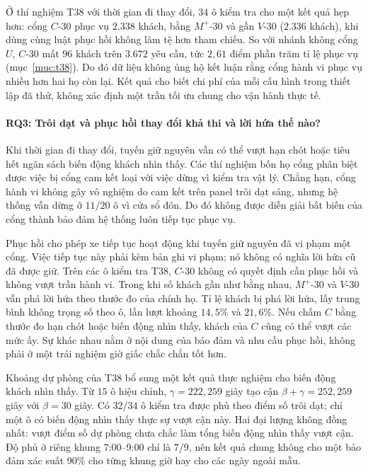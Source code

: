 Ở thí nghiệm T38 với thời gian đi thay đổi, $34$ ô kiểm tra cho một kết quả hẹp hơn:
cổng $C$-30 phục vụ $2.338$ khách, bằng $M^{+}$-30 và gần $V$-30 ($2.336$ khách), khi dùng
cùng luật phục hồi không làm tệ hơn tham chiếu. So với nhánh không cổng $U$, $C$-30 mất
$96$ khách trên $3.672$ yêu cầu, tức $2{,}61$ điểm phần trăm tỉ lệ phục vụ
(mục~\ref{muc:t38}). Do đó dữ liệu không ủng hộ kết luận rằng cổng hành vi phục vụ nhiều
hơn hai họ còn lại. Kết quả cho biết chi phí của mỗi cấu hình trong thiết lập đã thử,
không xác định một trần tối ưu chung cho vận hành thực tế.

\paragraph{RQ3: Trôi dạt và phục hồi thay đổi khả thi và lời hứa thế nào?}
Khi thời gian đi thay đổi, tuyến giữ nguyên vẫn có thể vượt hạn chót hoặc tiêu hết ngân
sách biến động khách nhìn thấy. Các thí nghiệm bốn họ cổng phân biệt được việc bị cổng cam
kết loại với việc dừng vì kiểm tra vật lý. Chẳng hạn, cổng hành vi không gây vô nghiệm do
cam kết trên panel trôi dạt sáng, nhưng hệ thống vẫn dừng ở $11/20$ ô vì cửa sổ đón. Do
đó không được diễn giải bất biến của cổng thành bảo đảm hệ thống luôn tiếp tục phục vụ.

Phục hồi cho phép xe tiếp tục hoạt động khi tuyến giữ nguyên đã vi phạm một cổng. Việc
tiếp tục này phải kèm bản ghi vi phạm; nó không có nghĩa lời hứa cũ đã được giữ. Trên các
ô kiểm tra T38, $C$-30 không có quyết định cần phục hồi và không vượt trần hành vi.
Trong khi số khách gần như bằng nhau, $M^{+}$-30 và $V$-30 vẫn phá lời hứa theo thước đo
của chính họ. Tỉ lệ khách bị phá lời hứa, lấy trung bình không trọng số theo ô,
lần lượt khoảng $14{,}5\%$ và $21{,}6\%$. Nếu chấm $C$ bằng thước đo hạn chót hoặc biến
động nhìn thấy, khách của $C$ cũng có thể vượt các mức ấy. Sự khác nhau nằm ở nội dung
của bảo đảm và nhu cầu phục hồi, không phải ở một trải nghiệm giờ giấc chắc chắn tốt hơn.

Khoảng dự phòng của T38 bổ sung một kết quả thực nghiệm cho biến động khách nhìn thấy.
Từ $15$ ô hiệu chỉnh, $\gamma=222{,}259$ giây tạo cận
$\beta+\gamma=252{,}259$ giây với $\beta=30$ giây. Có $32/34$ ô kiểm tra được phủ
theo điểm số trôi dạt; chỉ một ô có biến động nhìn thấy thực sự vượt cận này.
Hai đại lượng không đồng nhất: vượt điểm số dự phòng chưa chắc làm tổng biến động nhìn
thấy vượt cận. Độ phủ ở riêng khung 7:00--9:00 chỉ là $7/9$, nên kết quả chung không
cho một bảo đảm xác suất 90\% cho từng khung giờ hay cho các ngày ngoài mẫu.


